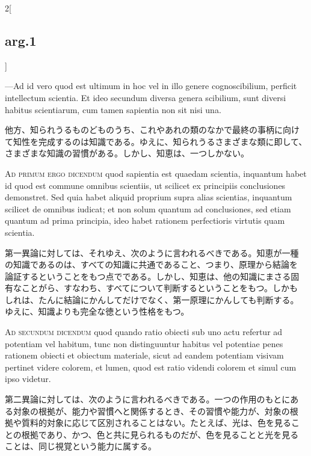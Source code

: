 \documentclass[paper=a4paper,fontsize=10pt,jafontsize=9pt,titlepage]{jlreq}
\begin{document}
\begin{paracol}{2}[\subsection{arg.1}]
\switchcolumn*

---Ad id vero quod est ultimum in hoc vel in illo genere
cognoscibilium, perficit intellectum scientia. Et ideo secundum
diversa genera scibilium, sunt diversi habitus scientiarum, cum tamen
sapientia non sit nisi una.

\switchcolumn

他方、知られうるものどものうち、これやあれの類のなかで最終の事柄に向け
て知性を完成するのは知識である。ゆえに、知られうるさまざまな類に即して、
さまざまな知識の習慣がある。しかし、知恵は、一つしかない。

\switchcolumn*[\subsection{ad.1}]

{\scshape Ad primum ergo dicendum} quod sapientia est quaedam
scientia, inquantum habet id quod est commune omnibus scientiis, ut
scilicet ex principiis conclusiones demonstret. Sed quia habet aliquid
proprium supra alias scientias, inquantum scilicet de omnibus iudicat;
et non solum quantum ad conclusiones, sed etiam quantum ad prima
principia, ideo habet rationem perfectioris virtutis quam scientia.

\switchcolumn

第一異論に対しては、それゆえ、次のように言われるべきである。知恵が一種
の知識であるのは、すべての知識に共通であること、つまり、原理から結論を
論証するということをもつ点でである。しかし、知恵は、他の知識にまさる固
有なことがら、すなわち、すべてについて判断するということをもつ。しかも
しれは、たんに結論にかんしてだけでなく、第一原理にかんしても判断する。
ゆえに、知識よりも完全な徳という性格をもつ。

\switchcolumn*[\subsection{ad.2}]

{\scshape Ad secundum dicendum} quod quando ratio obiecti sub uno actu
refertur ad potentiam vel habitum, tunc non distinguuntur habitus vel
potentiae penes rationem obiecti et obiectum materiale, sicut ad
eandem potentiam visivam pertinet videre colorem, et lumen, quod est
ratio videndi colorem et simul cum ipso videtur.

\switchcolumn

第二異論に対しては、次のように言われるべきである。一つの作用のもとにあ
る対象の根拠が、能力や習慣へと関係するとき、その習慣や能力が、対象の根
拠や質料的対象に応じて区別されることはない。たとえば、光は、色を見るこ
との根拠であり、かつ、色と共に見られるものだが、色を見ることと光を見る
ことは、同じ視覚という能力に属する。


\end{paracol}
\end{document}
